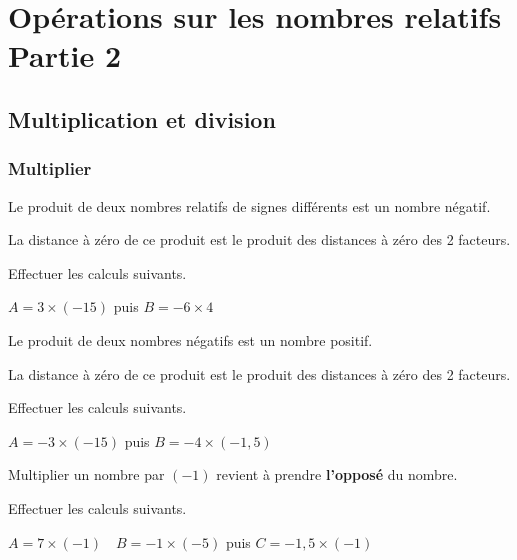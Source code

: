 \documentclass[a4paper]{book}
\begin{document}
\setcounter{chapter}{4}
\renewcommand{\monTitre}{Opérations sur les nombres relatifs \\ Partie 2}
\chapter{\monTitre}
\thispagestyle{fancy} 

   
\section{Multiplication et division}   
\subsection{Multiplier}
    
    \begin{propriete} 
        Le produit de deux nombres relatifs de signes différents est un nombre négatif. 
        
        La distance à zéro de ce produit est le produit des distances à zéro des 2 facteurs.
    \end{propriete}
    
    \begin{exemple}
        Effectuer les calculs suivants.

        $A = 3\times(-15)$ puis $B = -6 \times 4$
    \end{exemple}
    
    \begin{propriete} 
        Le produit de deux nombres négatifs est un nombre positif. 
        
        La distance à zéro de ce produit est le produit des distances à zéro des 2 facteurs.
    \end{propriete}
    
    \begin{exemple}
        Effectuer les calculs suivants.

        $A = -3\times(-15)$ puis $B = -4 \times (-1,5)$
    \end{exemple}
    
    \begin{propriete}
        Multiplier un nombre par \((-1)\) revient à prendre \textbf{l'opposé} du nombre.
    \end{propriete}
    
    \begin{exemple}
        Effectuer les calculs suivants.
        
        $A = 7\times (-1) \quad  B = -1 \times (-5)$ puis $C = -1,5\times (-1) $
    \end{exemple}
    
\end{document}
